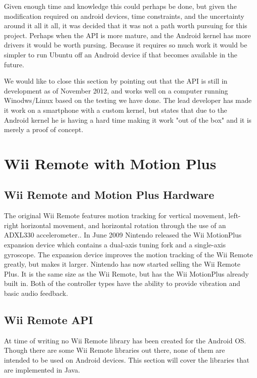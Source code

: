 Given enough time and knowledge this could perhaps be done, but given the modification required on android devices, time constraints, and the uncertainty around it all it all, it was decided that it was not a path worth pursuing for this project. Perhaps when the API is more mature, and the Android kernel has more drivers it would be worth pursing. Because it requires so much work it would be simpler to run Ubuntu off an Android device if that becomes available in the future. \cite{ubuntuAndroid}

We would like to close this section by pointing out that the API is still in development as of November 2012, and works well on a computer running Winodws/Linux based on the testing we have done. The lead developer has made it work on a smartphone with a custom kernel, but states that due to the Android kernel he is having a hard time making it work "out of the box" and it is merely a proof of concept.
\section{Wii Remote with Motion Plus}

\subsection{Wii Remote and Motion Plus Hardware}
The original Wii Remote features motion tracking for vertical movement, left-right horizontal movement, and horizontal rotation through the use of an ADXL330 accelerometer.\cite{wiiAccelerometer}.
In June 2009 Nintendo released the Wii MotionPlus expansion device which contains a dual-axis tuning fork and a single-axis gyroscope\cite{wiiMotionPlus}.
The expansion device improves the motion tracking of the Wii Remote greatly, but makes it larger. Nintendo has now started selling the Wii Remote Plus. It is the same size as the Wii Remote, but has the Wii MotionPlus already built in. Both of the controller types have the ability to provide vibration and basic audio feedback.

\subsection{Wii Remote API}
At time of writing no Wii Remote library has been created for the Android OS. Though there are some Wii Remote libraries out there, none of them are intended to be used on Android devices. This section will cover the libraries that are implemented in Java.

